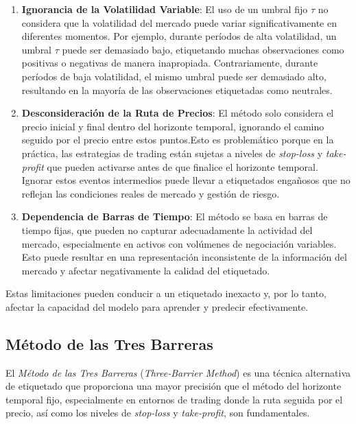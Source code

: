 \documentclass[a4paper,12pt, twoside]{report}
\begin{document}
\begin{enumerate}
    \item \textbf{Ignorancia de la Volatilidad Variable}: El uso de un umbral fijo $\tau$ 
    no considera que la volatilidad del mercado puede variar significativamente en diferentes 
    momentos. Por ejemplo, durante períodos de alta volatilidad, un umbral $\tau$ puede 
    ser demasiado bajo, etiquetando muchas observaciones como positivas o negativas de 
    manera inapropiada. Contrariamente, durante períodos de baja volatilidad, el mismo 
    umbral puede ser demasiado alto, resultando en la mayoría de las observaciones 
    etiquetadas como neutrales.
    
    \item \textbf{Desconsideración de la Ruta de Precios}: El método solo considera el 
    precio inicial y final dentro del horizonte temporal, ignorando el camino seguido 
    por el precio entre estos puntos.Esto es problemático porque en la práctica, las 
    estrategias de trading están sujetas a niveles de \textit{stop-loss} y 
    \textit{take-profit} que pueden activarse antes de que finalice el horizonte temporal.
    Ignorar estos eventos intermedios puede llevar a etiquetados engañosos que no reflejan 
    las condiciones reales de mercado y gestión de riesgo.

    \item \textbf{Dependencia de Barras de Tiempo}: El método se basa en barras de tiempo 
    fijas, que pueden no capturar adecuadamente la actividad del mercado, especialmente 
    en activos con volúmenes de negociación variables. Esto puede resultar en una 
    representación inconsistente de la información del mercado y afectar negativamente 
    la calidad del etiquetado.

\end{enumerate}

Estas limitaciones pueden conducir a un etiquetado inexacto y, por lo tanto, afectar 
la capacidad del modelo para aprender y predecir efectivamente.

\subsection{Método de las Tres Barreras}

El \textit{Método de las Tres Barreras} (\textit{Three-Barrier Method}) es una 
técnica alternativa de etiquetado que proporciona una mayor precisión que el 
método del horizonte temporal fijo, especialmente en entornos de trading donde 
la ruta seguida por el precio, así como los niveles de \textit{stop-loss} y 
\textit{take-profit}, son fundamentales.
\end{document}
